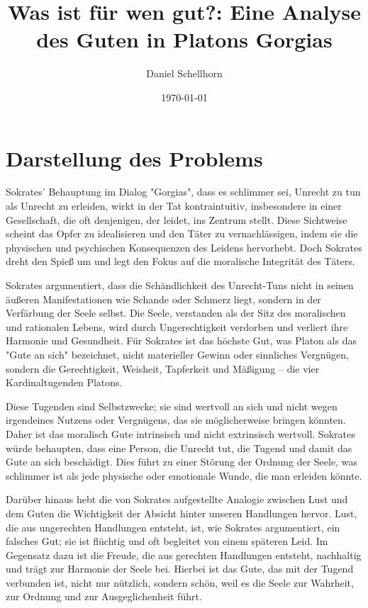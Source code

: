 \documentclass[12pt,a4paper]{article}
\title{Was ist für wen gut?: Eine Analyse des Guten in Platons Gorgias}
\author{Daniel Schellhorn}
\date{\today}
\begin{document}
\maketitle

\section{Darstellung des Problems}
Sokrates' Behauptung im Dialog "Gorgias", dass es schlimmer sei, Unrecht zu tun als Unrecht zu erleiden, wirkt in der Tat kontraintuitiv, insbesondere in einer Gesellschaft, die oft denjenigen, der leidet, ins Zentrum stellt. Diese Sichtweise scheint das Opfer zu idealisieren und den Täter zu vernachlässigen, indem sie die physischen und psychischen Konsequenzen des Leidens hervorhebt. Doch Sokrates dreht den Spieß um und legt den Fokus auf die moralische Integrität des Täters.

Sokrates argumentiert, dass die Schändlichkeit des Unrecht-Tuns nicht in seinen äußeren Manifestationen wie Schande oder Schmerz liegt, sondern in der Verfärbung der Seele selbst. Die Seele, verstanden als der Sitz des moralischen und rationalen Lebens, wird durch Ungerechtigkeit verdorben und verliert ihre Harmonie und Gesundheit. Für Sokrates ist das höchste Gut, was Platon als das "Gute an sich" bezeichnet, nicht materieller Gewinn oder sinnliches Vergnügen, sondern die Gerechtigkeit, Weisheit, Tapferkeit und Mäßigung – die vier Kardinaltugenden Platons.

Diese Tugenden sind Selbstzwecke; sie sind wertvoll an sich und nicht wegen irgendeines Nutzens oder Vergnügens, das sie möglicherweise bringen könnten. Daher ist das moralisch Gute intrinsisch und nicht extrinsisch wertvoll. Sokrates würde behaupten, dass eine Person, die Unrecht tut, die Tugend und damit das Gute an sich beschädigt. Dies führt zu einer Störung der Ordnung der Seele, was schlimmer ist als jede physische oder emotionale Wunde, die man erleiden könnte.

Darüber hinaus hebt die von Sokrates aufgestellte Analogie zwischen Lust und dem Guten die Wichtigkeit der Absicht hinter unseren Handlungen hervor. Lust, die aus ungerechten Handlungen entsteht, ist, wie Sokrates argumentiert, ein falsches Gut; sie ist flüchtig und oft begleitet von einem späteren Leid. Im Gegensatz dazu ist die Freude, die aus gerechten Handlungen entsteht, nachhaltig und trägt zur Harmonie der Seele bei. Hierbei ist das Gute, das mit der Tugend verbunden ist, nicht nur nützlich, sondern schön, weil es die Seele zur Wahrheit, zur Ordnung und zur Ausgeglichenheit führt.
\end{document}
